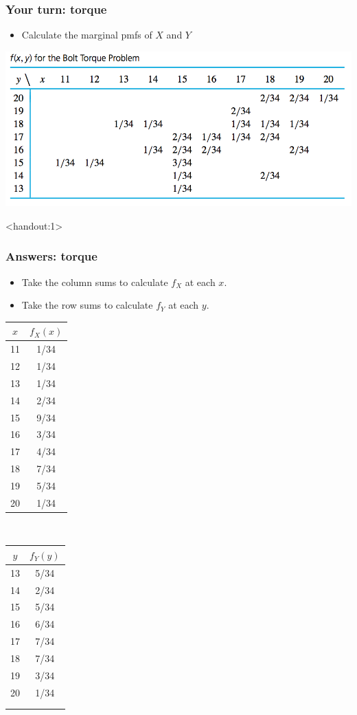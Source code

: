\documentclass[handout]{beamer}\usepackage{graphicx, color}
\newcommand{\answers}{1}
\numberwithin{equation}{section}
\begin{document}
\begin{frame}
\frametitle{Your turn: torque}
\begin{itemize}
\item Calculate the marginal pmfs of $X$ and $Y$
\end{itemize}
 \includegraphics{../../fig/torquetable.png}
\end{frame}

\begin{frame}<handout:\answers>
\frametitle{Answers: torque}
\begin{itemize}
\pause \item Take the column sums to calculate $f_X$ at each $x$.
\pause \item Take the row sums to calculate $f_Y$ at each $y$. 
\end{itemize}
\begin{center}
\pause \begin{tabular}{cc}
$x$ & $f_X(x)$  \\ \hline
11 & 1/34 \\ 
12 & 1/34 \\ 
13 & 1/34 \\ 
14 & 2/34 \\ 
15 & 9/34 \\ 
16 & 3/34 \\ 
17 & 4/34 \\ 
18 & 7/34 \\ 
19 & 5/34 \\ 
20 & 1/34 \\ 
\end{tabular} $\quad$ \begin{tabular}{cc}
$y$ & $f_Y(y)$ \\ \hline
13 & 5/34 \\ 
14 & 2/34 \\ 
15 & 5/34 \\ 
16 & 6/34 \\ 
17 & 7/34 \\ 
18 & 7/34 \\ 
19 & 3/34 \\ 
20 & 1/34 \\ 
{ } & { } \\
{} & {} \\
\end{tabular}
\end{center}
\end{frame}
\end{document}
